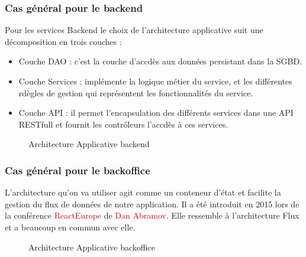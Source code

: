 \subsubsection{Cas g\'en\'eral pour le backend}
Pour les services Backend le choix de l'architecture applicative suit une d\'ecomposition en trois couches :
\begin{itemize}
\item Couche DAO : c'est la couche d'accd\`es aux donn\'ees persistant dans la SGBD.
\item Couche Services : impl\'emente la logique m\'etier du service, et les diff\'erentes rd\`egles de gestion qui repr\'esentent les fonctionnalit\'es du service.
\item Couche API : il permet l'encapsulation des diff\'erents services dans une API RESTfull et fournit les contr\^oleurs l'accd\`es \`a ces services.
\end{itemize}

\begin{figure}[H]
	\caption{\label{fig:my-label} Architecture Applicative backend}
\end{figure}


\subsubsection{Cas g\'en\'eral pour le backoffice}

L'architecture qu'on va utiliser agit comme un conteneur d'\'etat et facilite la gestion du flux de donn\'ees de notre application. Il a \'et\'e introduit en 2015 lors de la conf\'erence \textcolor{red}{ReactEurope} de \textcolor{red}{Dan Abramov}. Elle ressemble \`a l'architecture Flux et a beaucoup en commun avec elle.

\begin{figure}[H]
	\caption{\label{fig:my-label} Architecture Applicative backoffice}
\end{figure}

